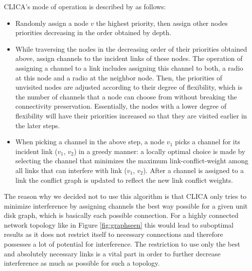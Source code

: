     CLICA's mode of operation is described by \cite{overview_caa} as follows:
    \begin{itemize}
      \item Randomly assign a node \(v\) the highest priority, then assign other
	nodes priorities decreasing in the order obtained by depth.
	
      \item While traversing the nodes in the decreasing order of their
	priorities obtained above, assign channels to the incident links
	of these nodes. The operation of assigning a channel to a link
	includes assigning this channel to both, a radio at this node and
	a radio at the neighbor node. Then, the priorities of unvisited
	nodes are adjusted according to their degree of flexibility, which
	is the number of channels that a node can choose from without
	breaking the connectivity preservation. Essentially, the nodes
	with a lower degree of flexibility will have their priorities
	increased so that they are visited earlier in the later steps.
	
      \item When picking a channel in the above step, a node \(v_1\) picks
	a channel for its incident link (\(v_1\), \(v_2\)) in a greedy manner: a
	locally optimal choice is made by selecting the channel that
	minimizes the maximum link-conflict-weight among all links
	that can interfere with link (\(v_1\), \(v_2\)). After a channel is assigned
	to a link the conflict graph is updated to reflect the new link conflict weights.
    \end{itemize}
  
    The reason why we decided not to use this algorithm is that \ac{CLICA} only tries to minimize interference by assigning channels the best way possible for a given
    unit disk graph, which is basically each possible connection. For a highly connected network topology like in Figure \ref{fig:graphseen} this would lead to suboptimal results
    as it does not restrict itself to necessary connections and therefore possesses a lot of potential for interference.
    The restriction to use only the best and absolutely necessary links is a vital part in order to 
    further decrease interference as much as possible for such a topology.
    
